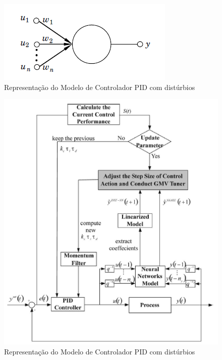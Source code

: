 \begin{figure}[htb]
  \caption{Representação do Modelo de Controlador PID com distúrbios}
  \begin{center}
      \includegraphics[scale=0.6]{img/neuron_astrom_p295}
  \end{center}
\end{figure}

\begin{figure}[htb]
  \caption{Representação do Modelo de Controlador PID com distúrbios}
  \begin{center}
      \includegraphics[scale=1]{img/pid_neural_Applying_p18}
  \end{center}
\end{figure}


